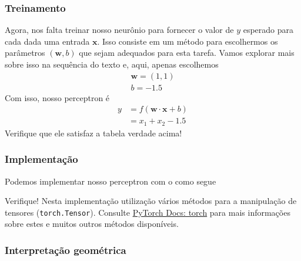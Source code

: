     
\subsubsection{Treinamento}

Agora, nos falta treinar nosso neurônio para fornecer o valor de $y$ esperado para cada dada uma entrada $\pmb{x}$. Isso consiste em um método para escolhermos os parâmetros $(\pmb{w},b)$ que sejam adequados para esta tarefa. Vamos explorar mais sobre isso na sequência do texto e, aqui, apenas escolhemos
\begin{gather}
  \pmb{w} = (1, 1)\\
  b = -1.5
\end{gather}
Com isso, nosso perceptron é
\begin{align}
  y &= f(\pmb{w}\cdot\pmb{x} + b)\\
    &= x_1 + x_2 - 1.5
\end{align}
Verifique que ele satisfaz a tabela verdade acima!


\subsubsection{Implementação}

\ifispython
Podemos implementar nosso perceptron com o {\pytorch} como segue



Verifique! Nesta implementação utilização vários métodos para a manipulação de tensores (\lstinline+torch.Tensor+). Consulte \href{https://pytorch.org/docs/stable/torch.html}{PyTorch Docs: torch} para mais informações sobre estes e muitos outros métodos disponíveis.
\fi

\subsubsection{Interpretação geométrica}

